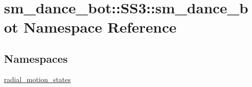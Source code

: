 \hypertarget{namespacesm__dance__bot_1_1SS3_1_1sm__dance__bot}{}\section{sm\+\_\+dance\+\_\+bot\+:\+:S\+S3\+:\+:sm\+\_\+dance\+\_\+bot Namespace Reference}
\label{namespacesm__dance__bot_1_1SS3_1_1sm__dance__bot}
\subsection*{Namespaces}
\begin{DoxyCompactItemize}
\item 
 \hyperlink{namespacesm__dance__bot_1_1SS3_1_1sm__dance__bot_1_1radial__motion__states}{radial\+\_\+motion\+\_\+states}
\end{DoxyCompactItemize}
